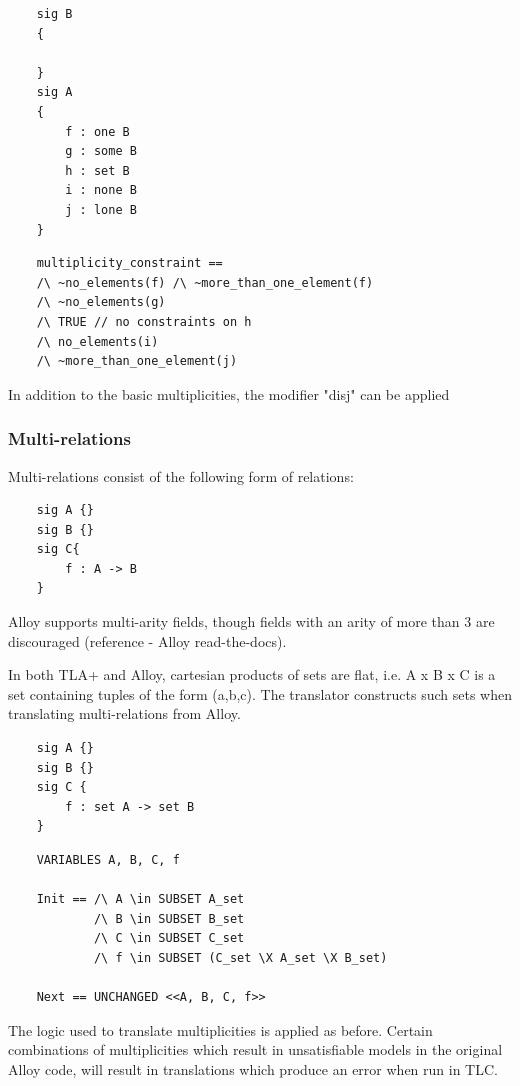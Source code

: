 \begin{verbatim}
	sig B
	{

	}
	sig A
	{
		f : one B
		g : some B
		h : set B
		i : none B
		j : lone B
	}
\end{verbatim}

\begin{verbatim}
	multiplicity_constraint == 
	/\ ~no_elements(f) /\ ~more_than_one_element(f)
	/\ ~no_elements(g)
	/\ TRUE // no constraints on h
	/\ no_elements(i)
	/\ ~more_than_one_element(j)
\end{verbatim}

In addition to the basic multiplicities, the modifier "disj" can be applied

\subsubsection{Multi-relations}

Multi-relations consist of the following form of relations:

\begin{verbatim}
	sig A {}
	sig B {}
	sig C{
		f : A -> B
	}
\end{verbatim}

Alloy supports multi-arity fields, though fields with an arity of more than 3 are discouraged (reference - Alloy read-the-docs). 

In both TLA+ and Alloy, cartesian products of sets are flat, i.e. A x B x C is a set containing tuples of the form (a,b,c). The translator constructs such sets when translating multi-relations from Alloy.

\begin{verbatim}
	sig A {}
	sig B {}
	sig C {
		f : set A -> set B
	}
\end{verbatim}

\begin{verbatim}
	VARIABLES A, B, C, f

	Init == /\ A \in SUBSET A_set
			/\ B \in SUBSET B_set
			/\ C \in SUBSET C_set
			/\ f \in SUBSET (C_set \X A_set \X B_set)

	Next == UNCHANGED <<A, B, C, f>>
\end{verbatim}

The logic used to translate multiplicities is applied as before. Certain combinations of multiplicities which result in unsatisfiable models in the original Alloy code, will result in translations which produce an error when run in TLC.


